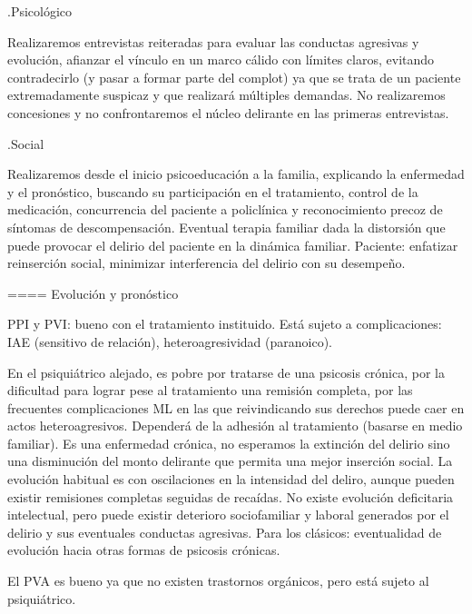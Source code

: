 .Psicológico

Realizaremos entrevistas reiteradas para evaluar las conductas agresivas y evolución, afianzar el vínculo en un marco cálido con límites claros, evitando contradecirlo (y pasar a formar parte del complot) ya que se trata de un paciente extremadamente suspicaz y que realizará múltiples demandas. No realizaremos concesiones y no confrontaremos el núcleo delirante en las primeras entrevistas.

.Social

Realizaremos desde el inicio psicoeducación a la familia, explicando la enfermedad y el pronóstico, buscando su participación en el tratamiento, control de la medicación, concurrencia del paciente a policlínica y reconocimiento precoz de síntomas de descompensación. Eventual terapia familiar dada la distorsión que puede provocar el delirio del paciente en la dinámica familiar. Paciente: enfatizar reinserción social, minimizar interferencia del delirio con su desempeño.

==== Evolución y pronóstico

PPI y PVI: bueno con el tratamiento instituido. Está sujeto a complicaciones: IAE (sensitivo de relación), heteroagresividad (paranoico).

En el psiquiátrico alejado, es pobre por tratarse de una psicosis crónica, por la dificultad para lograr pese al tratamiento una remisión completa, por las frecuentes complicaciones ML en las que reivindicando sus derechos puede caer en actos heteroagresivos. Dependerá de la adhesión al tratamiento (basarse en medio familiar). Es una enfermedad crónica, no esperamos la extinción del delirio sino una disminución del monto delirante que permita una mejor inserción social. La evolución habitual es con oscilaciones en la intensidad del deliro, aunque pueden existir remisiones completas seguidas de recaídas. No existe evolución deficitaria intelectual, pero puede existir deterioro sociofamiliar y laboral generados por el delirio y sus eventuales conductas agresivas. Para los clásicos: eventualidad de evolución hacia otras formas de psicosis crónicas.

El PVA es bueno ya que no existen trastornos orgánicos, pero está sujeto al psiquiátrico.
